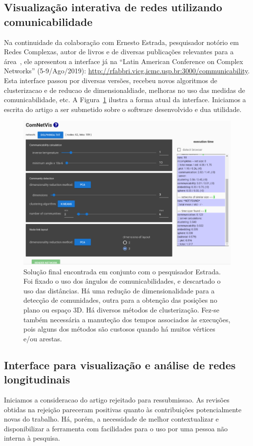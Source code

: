 \documentclass[a4paper, 11pt]{article}
\begin{document}
\subsection{Visualização interativa de redes utilizando comunicabilidade}\label{scom}
Na continuidade da colaboração com Ernesto Estrada, pesquisador notório em Redes Complexas, autor de livros e de diversas publicações relevantes para a área~\cite{ern1,ern2,ern3,ern4},
ele apresentou a interface já na ``Latin American Conference on Complex Networks'' (5-9/Ago/2019):
\url{http://rfabbri.vicg.icmc.usp.br:3000/communicability}.
Esta interface passou por diversas versões, recebeu novos algoritmos de clusterizacao e de reducao de dimensionaldiade, melhoras no uso das medidas de comunicabilidade, etc. A Figura~\ref{com} ilustra a forma atual da interface.
Iniciamos a escrita do artigo a ser submetido sobre o software desenvolvido e dua utilidade.

\begin{figure}[h!]
\centering
  \includegraphics[width=0.8\linewidth]{com}
\caption{%
  Solução final encontrada em conjunto com o pesquisador Estrada.
  Foi fixado o uso dos ângulos de comunicabilidades, e descartado o uso das distâncias.
  Há uma redução de dimensionalidade para a detecção de comunidades,
  outra para a obtenção das posições no plano ou espaço 3D.
  Há diversos métodos de clusterização.
  Fez-se também necessária a manuteção dos tempos associados às execuções,
  pois alguns dos métodos são custosos quando há muitos vértices e/ou arestas.
}\label{com}
\end{figure}


\subsection{Interface para visualização e análise de redes longitudinais}\label{sevo}
Iniciamos a consideracao do artigo rejeitado para ressubmissao.
As revisões obtidas na rejeição pareceram positivas quanto às contribuições potencialmente
novas do trabalho. Há, porém, a necessidade de melhor contextualizar e disponibilizar a ferramenta
com facilidades para o uso por uma pessoa não interna à pesquisa.
\end{document}
